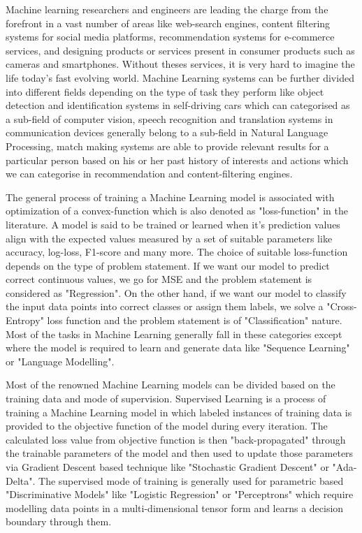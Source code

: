 \documentclass[12pt,a4paper]{article}
\begin{document}
Machine learning researchers and engineers are leading the charge from the forefront in a vast number of areas like web-search engines, content filtering systems for social media platforms, recommendation systems for e-commerce services, and designing products or services present in consumer products such as cameras and smartphones. Without theses services, it is very hard to imagine the life today's fast evolving world. Machine Learning systems can be further divided into different fields depending on the type of task they perform like object detection and identification systems in self-driving cars which can categorised as a sub-field of computer vision, speech recognition and translation systems in communication devices generally belong to a sub-field in Natural Language Processing, match making systems are able to provide relevant results for a particular person based on his or her past history of interests and actions which we can categorise in recommendation and content-filtering engines.
\vspace{2mm}

The general process of training a Machine Learning model is associated with optimization of a convex-function which is also denoted as "loss-function" in the literature. A model is said to be trained or learned when it's prediction values align with the expected values measured by a set of suitable parameters like accuracy, log-loss, F1-score and many more. The choice of suitable loss-function depends on the type of problem statement. If we want our model to predict correct continuous values, we go for MSE and the problem statement is considered as "Regression". On the other hand, if we want our model to classify the input data points into correct classes or assign them labels, we solve a "Cross-Entropy" loss function and the problem statement is of "Classification" nature. Most of the tasks in Machine Learning generally fall in these categories except where the model is required to learn and generate data like "Sequence Learning" or "Language Modelling".
\vspace{2mm}

Most of the renowned Machine Learning models can be divided based on the training data and mode of supervision. Supervised Learning is a process of training a Machine Learning model in which labeled instances of training data is provided to the objective function of the model during every iteration. The calculated loss value from objective function is then "back-propagated" through the trainable parameters of the model and then used to update those parameters via Gradient Descent based technique like "Stochastic Gradient Descent" or "Ada-Delta". The supervised mode of training is generally used for parametric based "Discriminative Models" like "Logistic Regression" or "Perceptrons" which require modelling data points in a multi-dimensional tensor form and learns a decision boundary through them.
\vspace{2mm}
\end{document}
